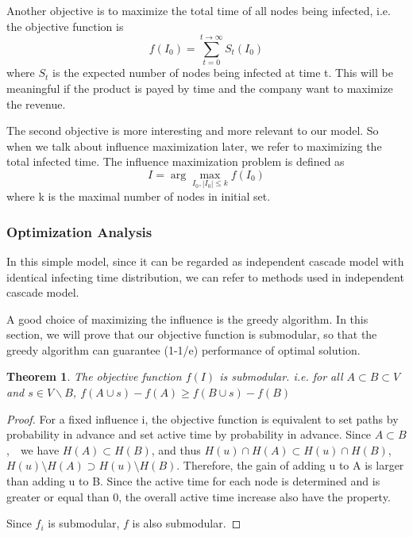 \documentclass{article}
\newtheorem{theorem}{Theorem}
\begin{document}
Another objective is to maximize the total time of all nodes being infected, i.e. the objective function is
\begin{equation}
f(I_0) = \sum_{t=0}^{t\to\infty}S_t(I_0)
\end{equation} 
where $S_t$ is the expected number of nodes being infected at time t. This will be meaningful if the product is payed by time and the company want to maximize the revenue.

The second objective is more interesting and more relevant to our model. So when we talk about influence maximization later, we refer to maximizing the total infected time. The influence maximization problem is defined as
\begin{equation}
I=\arg\max_{I_0,|I_0|\leq k}f(I_0)
\end{equation}
where k is the maximal number of nodes in initial set.

\subsubsection{Optimization Analysis}
In this simple model, since it can be regarded as independent cascade model with identical infecting time distribution, we can refer to methods used in independent cascade model.

A good choice of maximizing the influence is the greedy algorithm. In this section, we will prove that our objective function is submodular, so that the greedy algorithm can guarantee (1-1/e) performance of optimal solution.

\begin{theorem}
The objective function $f(I)$ is submodular. i.e. for all $A\subset B\subset V$ and $s\in V\backslash B$, $f(A\cup{s})-f(A)\geq f(B\cup{s})-f(B)$
\end{theorem}
\begin{proof}
For a fixed influence i, the objective function is equivalent to set paths by probability in advance and set active time by probability in advance. Since $A\subset B$,　we have $H(A)\subset H(B)$, and thus $H(u)\cap H(A)\subset H(u)\cap H(B)$, $H(u)\setminus H(A)\supset H(u)\setminus H(B)$. Therefore, the gain of adding u to A is larger than adding u to B. Since the active time for each node is determined and is greater or equal than 0, the overall active time increase also have the property.

Since $f_i$ is submodular, $f$ is also submodular.
\end{proof}
\end{document}
